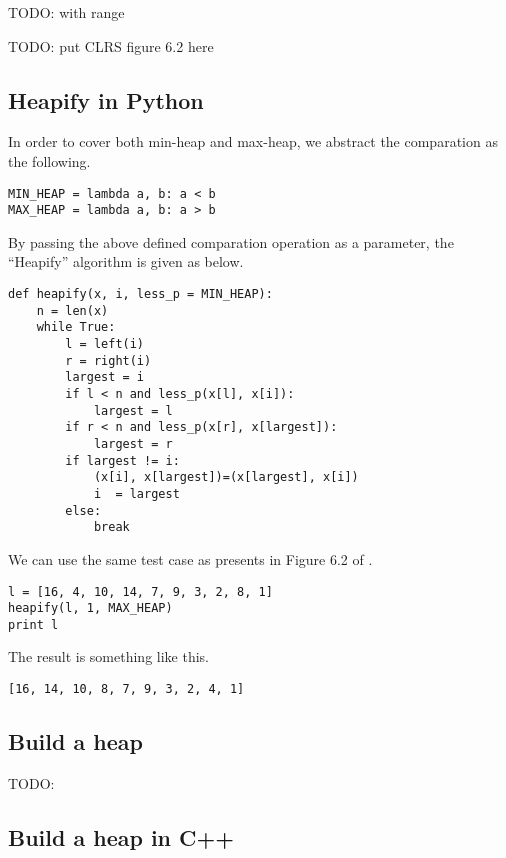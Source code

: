 \documentclass{article}
\begin{document}
TODO: with range

TODO: put CLRS figure 6.2 here

\subsection*{Heapify in Python}

In order to cover both min-heap and max-heap, we abstract the comparation
as the following.

\lstset{language = Python}
\begin{lstlisting}
MIN_HEAP = lambda a, b: a < b
MAX_HEAP = lambda a, b: a > b 
\end{lstlisting}

By passing the above defined comparation operation as a parameter, the ``Heapify''
algorithm is given as below.

\begin{lstlisting}
def heapify(x, i, less_p = MIN_HEAP):
    n = len(x)
    while True:
        l = left(i)
        r = right(i)
        largest = i
        if l < n and less_p(x[l], x[i]):
            largest = l
        if r < n and less_p(x[r], x[largest]):
            largest = r
        if largest != i:
            (x[i], x[largest])=(x[largest], x[i])
            i  = largest
        else:
            break 
\end{lstlisting}

We can use the same test case as presents in Figure 6.2 of \cite{CLRS}.

\begin{lstlisting}
l = [16, 4, 10, 14, 7, 9, 3, 2, 8, 1]
heapify(l, 1, MAX_HEAP)
print l 
\end{lstlisting}

The result is something like this.

\begin{verbatim}
[16, 14, 10, 8, 7, 9, 3, 2, 4, 1] 
\end{verbatim}

\subsection{Build a heap}

TODO:

\subsection*{Build a heap in C++}
\end{document}
